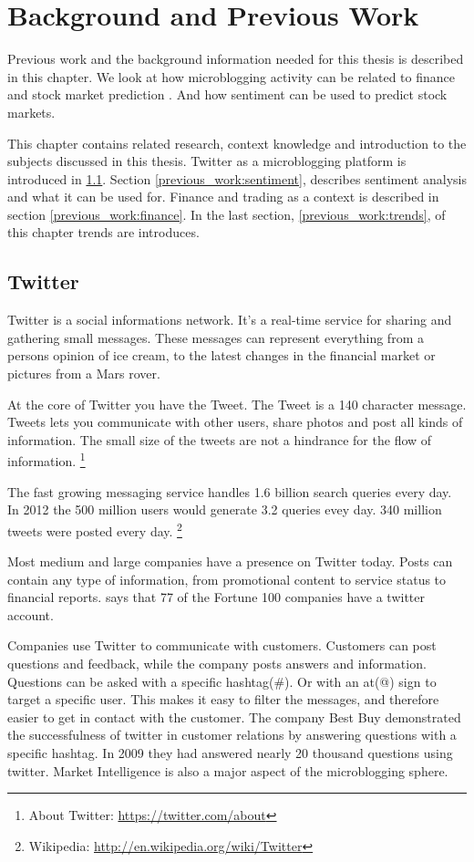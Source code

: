 \chapter{Background and Previous Work}\label{previous_work}
Previous work and the background information needed for this
thesis is described in this chapter. We look at how microblogging activity
can be related to finance and stock market prediction \cite{bollen2011}. And how
sentiment can be used to predict stock markets.

This chapter contains related research, context knowledge and introduction to
the subjects discussed in this thesis. Twitter as a microblogging platform is
introduced in \ref{previous_work:twitter}. Section
\ref{previous_work:sentiment}, describes sentiment analysis and what it can be used for.
Finance and trading as a context is described in section
\ref{previous_work:finance}. In the last section, \ref{previous_work:trends}, of
this chapter trends are introduces. 

\section{Twitter}\label{previous_work:twitter}
Twitter is a social informations network. 
It's a real-time service for sharing and gathering small messages. These
messages can represent everything from a persons opinion of ice cream, to the
latest changes in the financial market or pictures from a Mars rover. 

At the core of Twitter you have the Tweet. The Tweet is a 140 character
message. 
Tweets lets you communicate with other users, share photos and post all kinds of
information. The small size of the tweets are not a hindrance for the flow of
information. 
\footnote{About Twitter: \url{https://twitter.com/about}}

The fast growing messaging service handles 1.6 billion search queries every day.
In 2012 the 500 million users would generate 3.2 queries evey day. 340 million tweets were posted every day. 
\footnote{Wikipedia: \url{http://en.wikipedia.org/wiki/Twitter}} 

Most medium and large companies have a presence on Twitter today. Posts can contain
any type of information, from promotional content to service status to
financial reports. \cite[p8]{annikajubbega11:twitter_driver_stock_price} says
that 77 of the Fortune 100 companies have a twitter account. 

Companies use Twitter to communicate with customers. Customers can post
questions and feedback, while the company posts answers and information.
Questions can be asked with a specific hashtag(\#). Or with an at(@) sign to target a
specific user. This makes it easy to filter the messages, and therefore easier
to get in contact with the customer. The company Best Buy demonstrated the successfulness of
twitter in customer relations by answering questions with a specific hashtag. In
2009 they had answered nearly 20 thousand questions using twitter.
\cite[p1]{Li2013206} Market Intelligence is also a major aspect of the
microblogging sphere.

